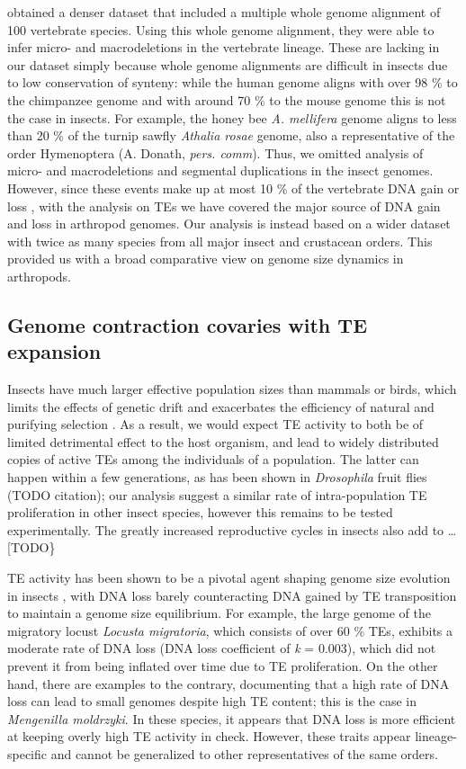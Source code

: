 \citet{Kapusta2017a} obtained a denser dataset that included a
multiple whole genome alignment of 100 vertebrate species. Using this
whole genome alignment, they were able to infer micro- and
macrodeletions in the vertebrate lineage. These are lacking in our
dataset simply because whole genome alignments are difficult in insects
due to low conservation of synteny: while the human genome aligns with
over 98 \% to the chimpanzee genome and with around 70 \% to the mouse
genome \cite{Mural2002} this is not the case in insects. For example,
the honey bee \emph{A. mellifera} genome aligns to less than 20 \% of
the turnip sawfly \emph{Athalia rosae} genome, also a representative of
the order Hymenoptera (A. Donath, \emph{pers. comm}). Thus, we omitted
analysis of micro- and macrodeletions and segmental duplications in the
insect genomes. However, since these events make up at most 10 \% of the
vertebrate DNA gain or loss \citep{Kapusta2017a}, with the analysis on
TEs we have covered the major source of DNA gain and loss in arthropod
genomes. Our analysis is instead based on a wider dataset with twice as
many species from all major insect and crustacean orders. This provided
us with a broad comparative view on genome size dynamics in arthropods.

\subsection{Genome contraction covaries with TE
expansion}\label{genome-contraction-covaries-with-te-expansion}

Insects have much larger effective population sizes than mammals or
birds, which limits the effects of genetic drift and exacerbates the
efficiency of natural and purifying selection \citep{Szitenberg2016}. As a
result, we would expect TE activity to both be of limited detrimental
effect to the host organism, and lead to widely distributed copies of
active TEs among the individuals of a population. The latter can happen
within a few generations, as has been shown in \emph{Drosophila} fruit
flies (TODO citation); our analysis suggest a similar rate of
intra-population TE proliferation in other insect species, however this
remains to be tested experimentally. The greatly increased reproductive
cycles in insects also add to \ldots{} {[}TODO\}

TE activity has been shown to be a pivotal agent shaping genome size
evolution in insects \citep{Maumus2015}, with DNA loss barely
counteracting DNA gained by TE transposition to maintain a genome size
equilibrium. For example, the large genome of the migratory locust
\emph{Locusta migratoria}, which consists of over 60 \% TEs, exhibits a
moderate rate of DNA loss (DNA loss coefficient of \emph{k} = 0.003),
which did not prevent it from being inflated over time due to TE
proliferation. On the other hand, there are examples to the contrary,
documenting that a high rate of DNA loss can lead to small genomes
despite high TE content; this is the case in \emph{Mengenilla
moldrzyki}. In these species, it appears that DNA loss is more efficient
at keeping overly high TE activity in check. However, these traits
appear lineage-specific and cannot be generalized to other
representatives of the same orders.

